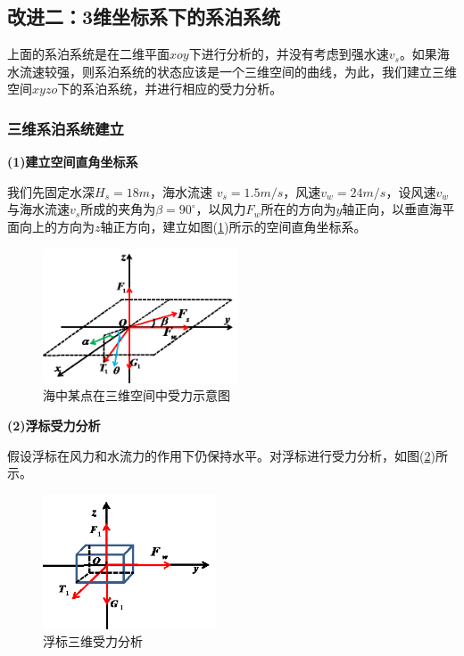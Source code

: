 \documentclass[UTF8]{ctexbook}
\theoremstyle{nonumberplain}
\begin{document}
    \subsection{改进二：3维坐标系下的系泊系统}
        \par
        上面的系泊系统是在二维平面$xoy$下进行分析的，并没有考虑到强水速$v_s$。如果海水流速较强，则系泊系统的状态应该是一个三维空间的曲线，为此，我们建立三维空间$xyzo$下的系泊系统，并进行相应的受力分析。
        \subsubsection{三维系泊系统建立}
            \par
            \textbf{(1)建立空间直角坐标系}
            \par
            我们先固定水深$H_s=18m$，海水流速 $v_s=1.5m/s$，风速$v_w =24m/s$，设风速$v_w$与海水流速$v_s$所成的夹角为$\beta=90^\circ$，以风力$F_w$所在的方向为$y$轴正向，以垂直海平面向上的方向为$z$轴正方向，建立如图(\ref{海中某点在三维空间中受力示意图})所示的空间直角坐标系。
            \begin{figure}[H]
            \centering
            \includegraphics[height=4cm]{images/onepoint_force_analysis_in_sea.jpg}
            \caption{海中某点在三维空间中受力示意图}
            \label{海中某点在三维空间中受力示意图}
            \end{figure}
            \par
            \textbf{(2)浮标受力分析}
            \par
            假设浮标在风力和水流力的作用下仍保持水平。对浮标进行受力分析，如图(\ref{浮标三维受力分析})所示。
            \begin{figure}[H]
            \centering
            \includegraphics[height=4cm]{images/buoy_three_dimensions_force_analysis.jpg}
            \caption{浮标三维受力分析}
            \label{浮标三维受力分析}
            \end{figure}
\end{document}
